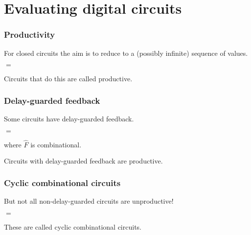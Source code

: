 \section{Evaluating digital circuits}

\begin{frame}
    \frametitle{Productivity}

    For \alert{closed circuits} the aim is to reduce to a (\alert{possibly infinite}) sequence of values.        

    \pause

    \begin{center}
        \quad$=$\quad
    \end{center}


    \pause

    Circuits that do this are called \alert{productive}.

\end{frame}

\begin{frame}
    \frametitle{Delay-guarded feedback}

    Some circuits have \alert{delay-guarded feedback}.

    \pause

    \begin{center}
        \quad$=$\quad
    \end{center}

    where $\hat{F}$ is combinational.

    \pause

    \vspace{1em}

    \begin{theorem}
        Circuits with delay-guarded feedback are productive.
    \end{theorem}

\end{frame}

\begin{frame}
    \frametitle{Cyclic combinational circuits}

    But not all non-delay-guarded circuits are unproductive!
    
    \pause

    \begin{center}
        \pause
        \quad$=$\quad
    \end{center}

    \pause

    These are called \alert{cyclic combinational circuits}.

\end{frame}

